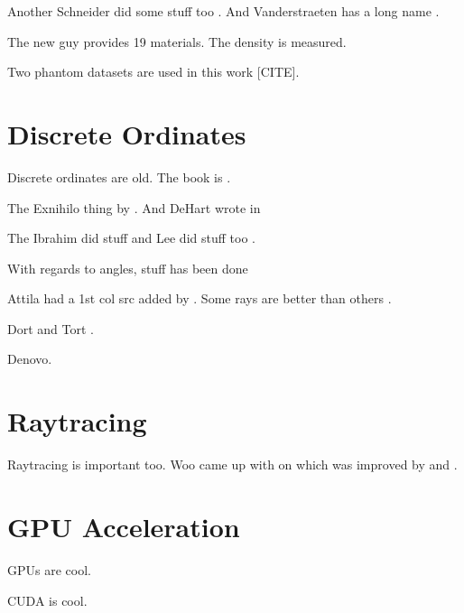Another Schneider did some stuff too \citep{ref:schneiderw}. And Vanderstraeten has a long name \citep{ref:vanderstraetenb}.

The new guy provides 19 materials. The density is measured.

Two phantom datasets are used in this work [CITE].

\section{Discrete Ordinates}\label{sec:discordlit}
Discrete ordinates are old. The book is \citet{ref:lewise}.

The Exnihilo thing by \citet{ref:evanst}. And DeHart wrote in \citep{ref:dehartm}

The Ibrahim did stuff \citep{ref:ibrahima} and Lee did stuff too \citep{ref:leeb}.

With regards to angles, stuff has been done \citep{ref:ahrensc}

Attila had a 1st col src added by \citep{ref:wareingt}. Some rays are better than others \citep{ref:mathewsk}.

Dort and Tort \citep{ref:rhoadesw}.

Denovo.

\section{Raytracing}

Raytracing is important too. Woo came up with on \citep{ref:wooa} which was improved by \citet{ref:liuy} and \citet{ref:hel}.

\section{GPU Acceleration}
GPUs are cool.

CUDA is cool.


\endinput
